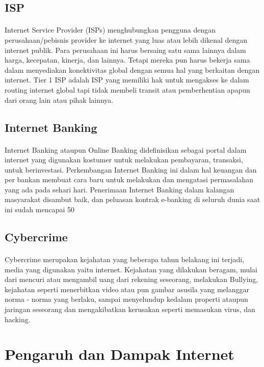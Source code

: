 \documentclass[12pt, a4paper]{article}
\begin{document}
\subsection{ISP}
\paragraph{} Internet Service Provider (ISPs) menghubungkan pengguna dengan perusahaan/pebisnis provider ke internet yang luas atau lebih dikenal dengan internet publik. Para perusahaan ini harus bersaing satu sama lainnya dalam harga, kecepatan, kinerja, dan lainnya. Tetapi mereka pun harus bekerja sama dalam menyediakan konektivitas global dengan semua hal yang berkaitan dengan internet. Tier 1 ISP adalah ISP yang memiliki hak untuk mengakses ke dalam routing internet global tapi tidak membeli transit atau pemberhentian apapun dari orang lain atau pihak lainnya.
\subsection{Internet Banking}
\paragraph{} Internet Banking ataupun Online Banking didefinisikan sebagai portal dalam internet yang digunakan kostumer untuk melakukan pembayaran, transaksi, untuk berinvestasi. Perkembangan Internet Banking ini dalam hal keuangan dan per bankan membuat cara baru untuk melakukan dan mengatasi permasalahan yang ada pada sehari hari. Penerimaan Internet Banking dalam kalangan masyarakat disambut baik, dan peluasan kontrak e-banking di seluruh dunia saat ini sudah mencapai 50%
\subsection{Cybercrime}
\paragraph{} Cybercrime merupakan kejahatan yang beberapa tahun belakang ini terjadi, media yang digunakan yaitu internet. Kejahatan yang dilakukan beragam, mulai dari mencuri atau mengambil uang dari rekening seseorang, melakukan Bullying, kejahatan seperti menerbitkan video atau pun gambar asusila yang melanggar norma -  norma yang berlaku, sampai menyelundup kedalam properti ataupun jaringan seseorang dan mengakibatkan kerusakan seperti memasukan virus, dan hacking.

\section{Pengaruh dan Dampak Internet}
\end{document}
